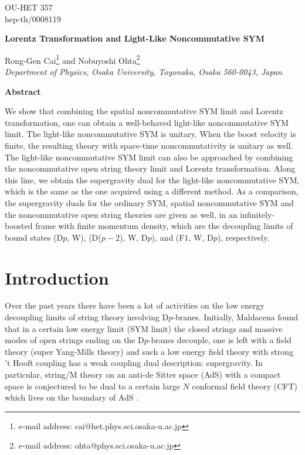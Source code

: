 \documentclass[a4paper,12pt]{article}
\newcommand{\sect}[1]{\setcounter{equation}{0}\section{#1}}
\begin{document}
\topmargin 0pt
\oddsidemargin 0mm

\renewcommand{\thefootnote}{\fnsymbol{footnote}}
\begin{titlepage}
\begin{flushright}
OU-HET 357 \\
hep-th/0008119
\end{flushright}

\vspace{5mm}
\begin{center}
{\Large \bf Lorentz Transformation and Light-Like Noncommutative SYM}
\vspace{10mm}

{\large
Rong-Gen Cai\footnote{e-mail address: cai@het.phys.sci.osaka-u.ac.jp} and
Nobuyoshi Ohta\footnote{e-mail address: ohta@phys.sci.osaka-u.ac.jp}} \\
\vspace{8mm}
{\em Department of Physics, Osaka University,
Toyonaka, Osaka 560-0043, Japan}

\end{center}
\vspace{5mm}
\centerline{{\bf{Abstract}}}
\vspace{5mm}

We show that combining the spatial noncommutative SYM limit and Lorentz
transformation, one can obtain a well-behaved light-like noncommutative
SYM limit. The light-like noncommutative SYM is unitary. When the boost
velocity is finite, the resulting theory with space-time noncommutativity is
unitary as well. The light-like noncommutative SYM limit can also be approached
by combining the noncommutative open string theory limit and Lorentz
transformation. Along this line, we obtain the supergravity dual for the
light-like noncommutative SYM, which is the same as the one acquired using
a different method. As a comparison, the supergravity duals for the ordinary
SYM, spatial noncommutative SYM and the noncommutative open string theories
are given as well, in an infinitely-boosted frame with finite momentum density,
which are the decoupling limits of bound states (D$p$, W), (D($p-2$), W, D$p$),
and (F$1$, W, D$p$), respectively.


\end{titlepage}

\newpage
\renewcommand{\thefootnote}{\arabic{footnote}}
\setcounter{footnote}{0}
\setcounter{page}{2}


\sect{Introduction}
Over the past years there have been a lot of activities on the low energy
decoupling limits of string theory involving D$p$-branes. Initially,
Maldacena \cite{Mald1}
found that in a certain low energy limit (SYM limit) the closed strings and
massive modes of open strings ending on the D$p$-branes decouple, one is
left with a field theory (super Yang-Mills theory) and such a low energy
field theory with strong 't Hooft coupling has a weak coupling dual
description: supergravity. In particular, string/M theory on
an anti-de Sitter space (AdS) with a compact space is conjectured to be
dual to a certain large $N$ conformal field theory (CFT) which lives on the
boundary of AdS \cite{Mald1,Gubs,Witt1,Itzh}.
\end{document}
